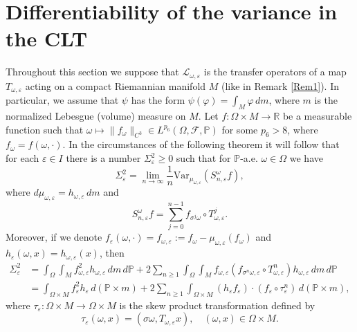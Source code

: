 \documentclass[11pt,reqno,a4paper]{article}
\theoremstyle{special}
\renewcommand{\epsilon}{\varepsilon}
\def\R{\mathbb{R}}
\def\om{\omega}
\begin{document}
\section{Differentiability of the variance in the CLT}\label{CLT}
Throughout this section  we suppose that $\mathcal L_{\om, \varepsilon}$ is the transfer operators of  a map $T_{\om, \varepsilon}$ acting on a compact Riemannian manifold $M$ (like in Remark \ref{Rem1}). In particular,
we assume that $\psi$ has the form $\psi(\varphi)=\int_M\varphi \, dm$, where $m$ is the normalized Lebesgue (volume) measure on $M$.
Let $f:\Omega\times M\to \R$ be a measurable function such that $\om\longmapsto \|f_\om\|_{C^3}\in L^{p_6}(\Omega,\mathcal F,\mathbb P)$ for some $p_6>8$, where $f_\om=f(\om, \cdot)$. In the circumstances of the following theorem it will follow that for each $\varepsilon\in I$ there is a number $\Sigma_{\varepsilon}^2 \ge 0$ such that for $\mathbb P$-a.e. $\om \in \Omega$ we have 
$$
\Sigma_{\varepsilon}^2=\lim_{n\to\infty}\frac1n\text{Var}_{\mu_{\om, \varepsilon}}(S_{n, \varepsilon}^\om f),
$$
where $d\mu_{\omega, \epsilon}=h_{\omega, \epsilon}\, dm$ and
$$
S_{n, \varepsilon}^\om f=\sum_{j=0}^{n-1}f_{\sigma^j\om}\circ T_{\om, \varepsilon}^j.
$$
Moreover, if we denote $f_\varepsilon(\om,\cdot)=f_{\om, \varepsilon}:=f_\om-\mu_{\om, \varepsilon}(f_\om)$ and $h_\varepsilon(\om,x)=h_{\om, \varepsilon}(x)$,
then
\begin{equation}\label{Var form}
\begin{split}
\Sigma_{\varepsilon}^2 &=\int_\Omega \int_M f_{\om, \varepsilon}^2h_{\om, \varepsilon}\, dm\, d\mathbb P+2\sum_{n\geq1}\int_\Omega\int_M f_{\om, \varepsilon} (f_{\sigma^n \omega, \varepsilon}\circ T_{\om, \epsilon}^n)h_{\om, \varepsilon}\, dm\,  d\mathbb P \\
&=\int_{\Omega \times M}f_{\varepsilon}^2 h_{\varepsilon}\, d(\mathbb P \times m)+2\sum_{n\ge 1}\int_{\Omega \times M} (h_\epsilon f_{\varepsilon}) \cdot (f_{\varepsilon} \circ \tau_\epsilon^n)\, d(\mathbb P\times m),
\end{split}
\end{equation}
where $\tau_{\varepsilon}:\Omega\times M\to \Omega\times M$ is the skew product transformation defined  by \[\tau_\varepsilon(\om,x)=(\sigma \om,T_{\om, \varepsilon}x), \quad (\om, x)\in \Omega \times M. \]
\end{document}
